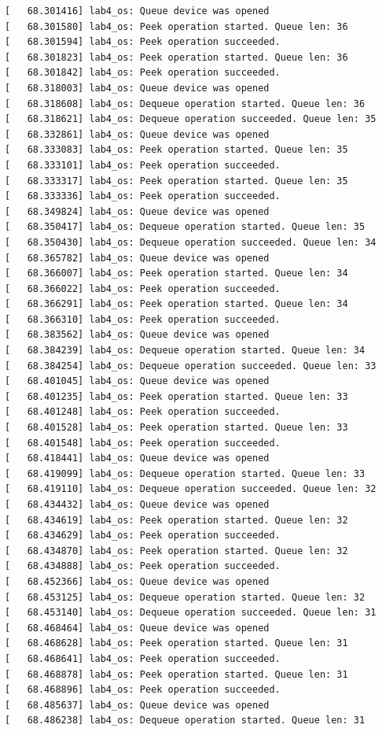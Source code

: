 \documentclass[a4paper,14pt]{extarticle}
\begin{document}
\begin{verbatim}
[   68.301416] lab4_os: Queue device was opened
[   68.301580] lab4_os: Peek operation started. Queue len: 36
[   68.301594] lab4_os: Peek operation succeeded.
[   68.301823] lab4_os: Peek operation started. Queue len: 36
[   68.301842] lab4_os: Peek operation succeeded.
[   68.318003] lab4_os: Queue device was opened
[   68.318608] lab4_os: Dequeue operation started. Queue len: 36
[   68.318621] lab4_os: Dequeue operation succeeded. Queue len: 35
[   68.332861] lab4_os: Queue device was opened
[   68.333083] lab4_os: Peek operation started. Queue len: 35
[   68.333101] lab4_os: Peek operation succeeded.
[   68.333317] lab4_os: Peek operation started. Queue len: 35
[   68.333336] lab4_os: Peek operation succeeded.
[   68.349824] lab4_os: Queue device was opened
[   68.350417] lab4_os: Dequeue operation started. Queue len: 35
[   68.350430] lab4_os: Dequeue operation succeeded. Queue len: 34
[   68.365782] lab4_os: Queue device was opened
[   68.366007] lab4_os: Peek operation started. Queue len: 34
[   68.366022] lab4_os: Peek operation succeeded.
[   68.366291] lab4_os: Peek operation started. Queue len: 34
[   68.366310] lab4_os: Peek operation succeeded.
[   68.383562] lab4_os: Queue device was opened
[   68.384239] lab4_os: Dequeue operation started. Queue len: 34
[   68.384254] lab4_os: Dequeue operation succeeded. Queue len: 33
[   68.401045] lab4_os: Queue device was opened
[   68.401235] lab4_os: Peek operation started. Queue len: 33
[   68.401248] lab4_os: Peek operation succeeded.
[   68.401528] lab4_os: Peek operation started. Queue len: 33
[   68.401548] lab4_os: Peek operation succeeded.
[   68.418441] lab4_os: Queue device was opened
[   68.419099] lab4_os: Dequeue operation started. Queue len: 33
[   68.419110] lab4_os: Dequeue operation succeeded. Queue len: 32
[   68.434432] lab4_os: Queue device was opened
[   68.434619] lab4_os: Peek operation started. Queue len: 32
[   68.434629] lab4_os: Peek operation succeeded.
[   68.434870] lab4_os: Peek operation started. Queue len: 32
[   68.434888] lab4_os: Peek operation succeeded.
[   68.452366] lab4_os: Queue device was opened
[   68.453125] lab4_os: Dequeue operation started. Queue len: 32
[   68.453140] lab4_os: Dequeue operation succeeded. Queue len: 31
[   68.468464] lab4_os: Queue device was opened
[   68.468628] lab4_os: Peek operation started. Queue len: 31
[   68.468641] lab4_os: Peek operation succeeded.
[   68.468878] lab4_os: Peek operation started. Queue len: 31
[   68.468896] lab4_os: Peek operation succeeded.
[   68.485637] lab4_os: Queue device was opened
[   68.486238] lab4_os: Dequeue operation started. Queue len: 31

\end{verbatim}
\end{document}

